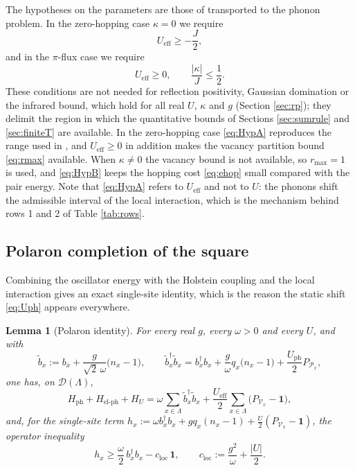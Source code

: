 \documentclass[11pt]{article}
\numberwithin{equation}{section}
\newcommand{\id}{\mathbf{1}}
\newcommand{\Lamb}{\Lambda}
\newcommand{\ph}{\mathrm{ph}}
\newcommand{\eff}{\mathrm{eff}}
\newtheorem{lemma}[theorem]{Lemma}
\theoremstyle{definition}
\begin{document}
The hypotheses on the parameters are those of \cite{rens2026pkodlro} transported to the
phonon problem. In the zero-hopping case $\kappa=0$ we require
\begin{equation}
U_{\eff}\ge-\frac{J}{2},
\label{eq:HypA}
\end{equation}
and in the $\pi$-flux case we require
\begin{equation}
U_{\eff}\ge0,\qquad \frac{|\kappa|}{J}\le\frac12 .
\label{eq:HypB}
\end{equation}
These conditions are not needed for reflection positivity, Gaussian domination or the
infrared bound, which hold for all real $U$, $\kappa$ and $g$ (Section \ref{sec:rp}); they
delimit the region in which the quantitative bounds of Sections \ref{sec:sumrule} and
\ref{sec:finiteT} are available. In the zero-hopping case \eqref{eq:HypA} reproduces the
range used in \cite{rens2026pkodlro}, and $U_{\eff}\ge0$ in addition makes the vacancy
partition bound \eqref{eq:rmax} available. When $\kappa\ne0$ the vacancy bound is not
available, so $r_{\max}=1$ is used, and \eqref{eq:HypB} keeps the hopping cost
\eqref{eq:ehop} small compared with the pair energy. Note that \eqref{eq:HypA} refers
to $U_{\eff}$ and not to $U$: the phonons shift the admissible interval of the local
interaction, which is the mechanism behind rows 1 and 2 of Table \ref{tab:rows}.

\subsection{Polaron completion of the square}

Combining the oscillator energy with the Holstein coupling and the local interaction
gives an exact single-site identity, which is the reason the static shift \eqref{eq:Uph}
appears everywhere.

\begin{lemma}[Polaron identity]\label{lem:polaron}
For every real $g$, every $\omega>0$ and every $U$, and with
\begin{equation}
\tilde b_{x}:=b_{x}+\frac{g}{\sqrt2\,\omega}\big(n_{x}-1\big),\qquad
\tilde b_{x}^{\dagger}\tilde b_{x}=b_{x}^{\dagger}b_{x}+\frac{g}{\omega}q_{x}\big(n_{x}-1\big)+\frac{U_{\mathrm{ph}}}{2}P_{\mathcal{P}_{x}},
\label{eq:tildeb}
\end{equation}
one has, on $\mathcal{D}(\Lamb)$,
\begin{equation}
H_{\ph}+H_{\text{el-ph}}+H_{U}
=\omega\sum_{x\in\Lamb}\tilde b_{x}^{\dagger}\tilde b_{x}
+\frac{U_{\eff}}{2}\sum_{x\in\Lamb}\big(P_{\mathcal{V}_{x}}-\id\big),
\label{eq:polaron}
\end{equation}
and, for the single-site term $h_{x}:=\omega b_{x}^{\dagger}b_{x}+g q_{x}(n_{x}-1)+\frac{U}{2}(P_{\mathcal{V}_{x}}-\id)$,
the operator inequality
\begin{equation}
h_{x}\ge\frac{\omega}{2}\,b_{x}^{\dagger}b_{x}-c_{\mathrm{loc}}\,\id,\qquad
c_{\mathrm{loc}}:=\frac{g^{2}}{\omega}+\frac{|U|}{2}.
\label{eq:lower}
\end{equation}
\end{lemma}
\end{document}
